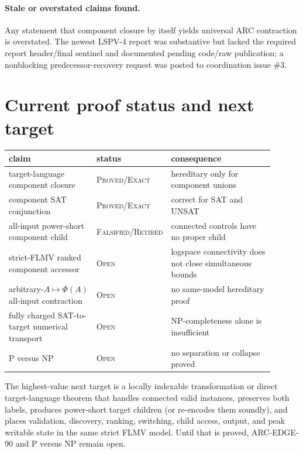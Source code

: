 \documentclass[11pt]{article}
\newcommand{\Status}[1]{\textsc{#1}}
\begin{document}
\paragraph{Stale or overstated claims found.}
Any statement that component closure by itself yields universal ARC contraction
is overstated.  The newest LSPV-4 report was substantive but lacked the required
report header/final sentinel and documented pending code/raw publication; a
nonblocking predecessor-recovery request was posted to coordination issue \#3.

\section{Current proof status and next target}
\begin{center}
\begin{tabular}{p{0.34\linewidth}p{0.16\linewidth}p{0.40\linewidth}}
\toprule
claim & status & consequence\\
\midrule
target-language component closure & \Status{Proved/Exact} & hereditary only for
component unions\\
component SAT conjunction & \Status{Proved/Exact} & correct for SAT and UNSAT\\
all-input power-short component child & \Status{Falsified/Retired} & connected
controls have no proper child\\
strict-FLMV ranked component accessor & \Status{Open} & logspace connectivity
does not close simultaneous bounds\\
arbitrary-$A\mapsto\Phi(A)$ all-input contraction & \Status{Open} & no same-model
hereditary proof\\
fully charged SAT-to-target numerical transport & \Status{Open} & NP-completeness
alone is insufficient\\
P versus NP & \Status{Open} & no separation or collapse proved\\
\bottomrule
\end{tabular}
\end{center}
The highest-value next target is a locally indexable transformation or direct
target-language theorem that handles connected valid instances, preserves both
labels, produces power-short target children (or re-encodes them soundly), and
places validation, discovery, ranking, switching, child access, output, and peak
writable state in the same strict FLMV model.  Until that is proved, ARC-EDGE-90
and P versus NP remain open.

\end{document}
